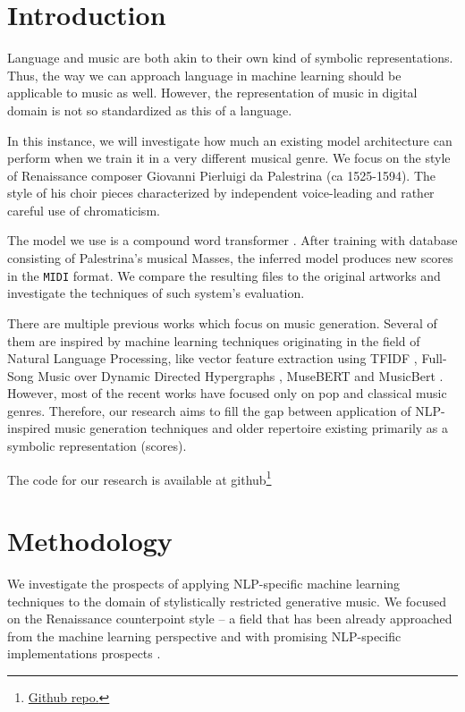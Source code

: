 \documentclass{article}
\begin{document}
\begin{multicols}{2}

    \section{Introduction}
        Language and music are both akin to their own kind of symbolic representations. Thus, the way we can approach language in machine learning should be applicable to music as well. However, the representation of music in digital domain is not so standardized as this of a language.
        
        In this instance, we will investigate how much an existing model architecture can perform when we train it in a very different musical genre. We focus on the style of Renaissance composer Giovanni Pierluigi da Palestrina (ca 1525-1594). The style of his choir pieces characterized by independent voice-leading and rather careful use of chromaticism. 
        
        The model we use is a compound word transformer \cite{hsiao_compound_2021}.
        After training with database consisting of Palestrina's musical Masses, the inferred model produces new scores in the \texttt{MIDI} format. We compare the resulting files to the original artworks and investigate the techniques of such system's evaluation.

        There are multiple previous works which focus on music generation. Several of them are inspired by machine learning techniques originating in the field of Natural Language Processing, like vector feature extraction using TF\*IDF \cite{mennen_pattern_nodate}, Full-Song Music over Dynamic Directed Hypergraphs \cite{huang2018music}, MuseBERT \cite{zeng_musicbert_2021} and MusicBert \cite{zeng2021musicbert}. However, most of the recent works have focused only on pop and classical music genres. Therefore, our research aims to fill the gap between application of NLP-inspired music generation techniques and older repertoire existing primarily as a symbolic representation (scores).

        The code for our research is available at github\footnote{\href{https://github.com/ArturJD96/Leiden_ML4NLP_2023-4}{Github repo.}}
        
    \section{Methodology}

        We investigate the prospects of applying NLP-specific machine learning techniques to the domain of stylistically restricted generative music. We focused on the Renaissance counterpoint style -- a field that has been already approached from the machine learning perspective \cite{adiloglu_machine_2007} \cite{nichols_modeling_2022} \cite{arthur_vicentino_2021} \cite{kalonaris_computational_2020} \cite{farbood_analysis_2001} and with promising NLP-specific implementations prospects \cite{mennen_pattern_nodate} \cite{nichols_modeling_2022} \cite{huang2018music}.
        

\end{multicols}
\end{document}
